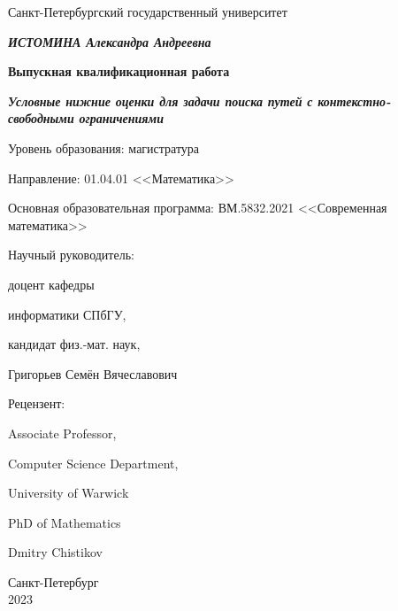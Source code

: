 \documentclass[12pt]{article}
\begin{document}
    \vspace{3.3cm}
    \centerline{\normalsize Санкт-Петербургский государственный университет}

\vspace{3.3cm}

\begin{center}
    \bf\textit{\normalsize ИСТОМИНА Александра Андреевна}
\end{center}

\begin{center}
    \bf\normalsize Выпускная квалификационная работа
\end{center}

\begin{center}
	\bf\textit{\normalsize
    Условные нижние оценки для задачи поиска путей с контекстно-свободными ограничениями}
\end{center}

\vspace{0.7cm}

\begin{center}
\normalsize
    Уровень образования: магистратура
    
    Направление: 01.04.01 <<Математика>>
    
    Основная образовательная программа: ВМ.5832.2021 <<Современная математика>>
    
    
\end{center}

\vspace{1.2cm}

{\parindent=9.5cm \normalsize
	Научный руководитель: \par
	доцент кафедры \par
	информатики СПбГУ, \par
	кандидат физ.-мат. наук, \par
	Григорьев Семён Вячеславович \par}

\vspace{0.8cm}

{\parindent=9.5cm \normalsize
	Рецензент: \par
	 Associate Professor, \par
	 Computer Science Department, \par 
	 University of Warwick \par
	 PhD of Mathematics \par
	 Dmitry Chistikov \par}

\vspace{2cm}
\begin{center}
	\normalsize
	Санкт-Петербург \\
	2023
\end{center}
\thispagestyle{empty}
\vfill\eject
      \par
\end{document}
